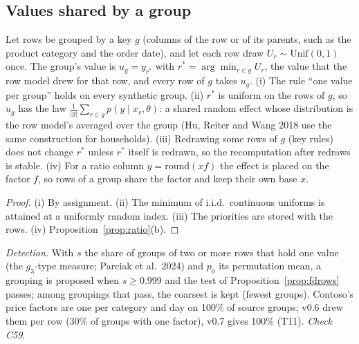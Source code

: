 \subsection{Values shared by a group}
\begin{proposition}\label{prop:groupfx}
Let rows be grouped by a key $g$ (columns of the row or of its parents, such as the product category and the order date), and let each row draw $U_r\sim\mathrm{Unif}(0,1)$ once. The group's value is $u_g=y_{r^*}$ with $r^*=\arg\min_{r\in g}U_r$, the value that the row model drew for that row, and every row of $g$ takes $u_g$. (i) The rule ``one value per group'' holds on every synthetic group. (ii) $r^*$ is uniform on the rows of $g$, so $u_g$ has the law $\frac1{|g|}\sum_{r\in g}p(y\mid x_r,\theta)$: a shared random effect whose distribution is the row model's averaged over the group (Hu, Reiter and Wang 2018 use the same construction for households). (iii) Redrawing some rows of $g$ (key rules) does not change $r^*$ unless $r^*$ itself is redrawn, so the recomputation after redraws is stable. (iv) For a ratio column $y=\mathrm{round}(xf)$ the effect is placed on the factor $f$, so rows of a group share the factor and keep their own base $x$.
\end{proposition}
\begin{proof}
(i) By assignment. (ii) The minimum of i.i.d.\ continuous uniforms is attained at a uniformly random index. (iii) The priorities are stored with the rows. (iv) Proposition~\ref{prop:ratio}(b).
\end{proof}
\noindent \emph{Detection.} With $s$ the share of groups of two or more rows that hold one value (the $g_3$-type measure; Parciak et al.\ 2024) and $p_0$ its permutation mean, a grouping is proposed when $s\ge0.999$ and the test of Proposition~\ref{prop:fdrows} passes; among groupings that pass, the coarsest is kept (fewest groups). Contoso's price factors are one per category and day on 100\% of source groups; v0.6 drew them per row (30\% of groups with one factor), v0.7 gives 100\% (T11). \emph{Check C59}.

